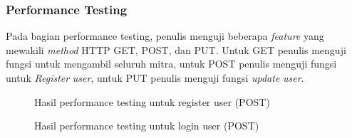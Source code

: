 \subsubsection{Performance Testing}
Pada bagian performance testing, penulis menguji beberapa \textit{feature} yang mewakili \textit{method} HTTP GET, POST, dan PUT. Untuk GET penulis menguji fungsi untuk mengambil seluruh mitra, untuk POST penulis menguji fungsi untuk \textit{Register} \textit{user}, untuk PUT penulis menguji fungsi \textit{update} \textit{user}.

\begin{figure}[H]
  {\par}
  \caption{Hasil performance testing untuk register user (POST)}
  \label{register-testing}
\end{figure}

\begin{figure}[H]
  {\par}
  \caption{Hasil performance testing untuk login user (POST)}
  \label{login-testing}
\end{figure}

